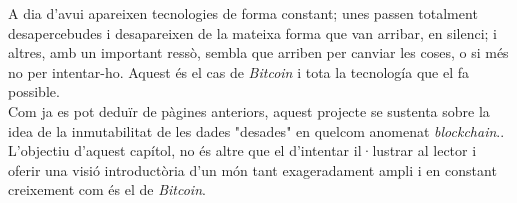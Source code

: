 A dia d'avui apareixen tecnologies de forma constant; unes passen totalment desapercebudes i desapareixen de la mateixa forma que van arribar, en silenci; i altres, amb un important ressò, sembla que arriben per canviar les coses, o si més no per intentar-ho. Aquest és el cas de \textit{Bitcoin} i tota la tecnología que el fa possible.\\
\newline Com ja es pot deduïr de pàgines anteriors, aquest projecte se sustenta sobre la idea de la inmutabilitat de les dades "desades" en quelcom anomenat \textit{blockchain}..\\
\newline L'objectiu d'aquest capítol, no és altre que el d'intentar il·lustrar al lector i oferir una visió introductòria d'un món tant exageradament ampli i en constant creixement com és el de \textit{Bitcoin}.

\clearpage

\clearpage